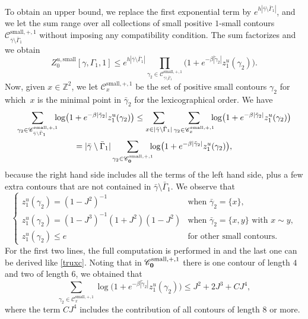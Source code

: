 \documentclass[10pt]{amsart}
\let\mathcal\mathscr
\numberwithin{equation}{section}
\theoremstyle{plain}
\theoremstyle{definition}
\newcommand{\sm}{\mathrm{small}}
\newcommand{\cC}{{\ensuremath{\mathcal C}} }
\newcommand{\bbZ}{{\ensuremath{\mathbb Z}} }
\newcommand{\gb}{\beta}
\newcommand{\gG}{\Gamma}
\begin{document}
To obtain an upper bound, we replace the first exponential term by $e^{h|\bar \gamma \setminus \bar \gG_1|}$, and we let the sum range over all collections of small
positive $1$-small contours
$\cC^{\sm,+,1}_{\bar \gamma\setminus \bar \gG_1}$ without imposing any compatibility condition.
The sum factorizes and we obtain
\begin{equation*}
Z^{u,\sm}_{0}[\gamma,\gG_1,1]\le
e^{h|\bar \gamma \setminus \bar \gG_1|} \prod_{\gamma_2 \in \cC^{\sm,+,1}_{\bar \gamma\setminus \bar \gG_1}}
\bigl(1+ e^{-\gb |\tilde\gamma_2|}
z^u_{1}(\gamma_2) \bigr).
\end{equation*}
Now, given $x\in \bbZ^2$, we let $\cC^{\sm,+,1}_x$ be the set of positive small contours $\gamma_2$ for which~$x$ is the minimal point in $\bar \gamma_2$ for the lexicographical order.
We have
\begin{multline*}
\sum_{ \gamma_2 \in \cC^{\sm,+,1}_{\bar \gamma\setminus \bar \gG_1}}\hspace*{-2mm} \log \bigl(1+ e^{-\gb |\tilde\gamma_2|}
z^u_{1}(\gamma_2)\bigr)\le \sum_{x\in |\bar \gamma\setminus \bar \gG_1|} \sum_{\gamma_2 \in \cC^{\sm,+,1}_x} \hspace*{-2mm}\log \bigl(1+ e^{-\gb |\tilde\gamma_2|}
z^u_{1}(\gamma_2)\bigr)\\
=|\bar \gamma\setminus \bar \gG_1| \sum_{\gamma_2 \in \cC^{\sm,+,1}_{\bf 0}} \hspace*{-2mm}\log \bigl(1+ e^{-\gb |\tilde\gamma_2|}
z^u_{1}(\gamma_2)\bigr),
\end{multline*}
because the right hand side includes all the terms of the left hand side, plus a few extra contours that are not contained in $\bar \gamma\setminus \bar \gG_1$.
We observe that
\begin{equation}\label{night}
\begin{cases}
z^u_{1}(\gamma_2)=(1-J^2)^{-1} & \text{when } \bar \gamma_2=\{x\},\\
z^u_{1}(\gamma_2)=(1-J^3)^{-1}(1+J^2)(1-J^2)& \text{when } \bar \gamma_2=\{x,y\} \text{ with } x\sim y,\\
z^u_{1}(\gamma_2)\le e & \text{for other small contours}.
\end{cases}
\end{equation}
For the first two lines, the full computation is performed in \cite[Proof of Lem.\,3.2]{cf:part1} and the last one can be derived like \eqref{truxc}.
Noting that in $\cC^{\sm,+,1}_{\bf 0}$ there is one contour of length $4$ and two of length $6$, we obtained that
\begin{equation*}
\sum_{\gamma_2 \in \cC^{\sm,+,1}_x}\log \bigl(1+ e^{-\gb |\tilde\gamma_2|}
z^u_{1}(\gamma_2)\bigr)\le J^2+2J^3+ C J^4,
\end{equation*}
where the term $CJ^4$ includes the contribution of all contours of length $8$ or more.
\end{document}
